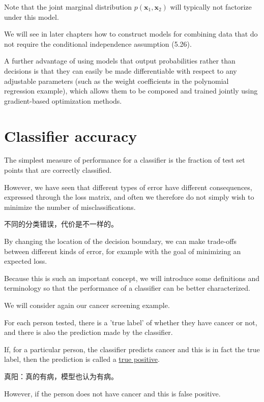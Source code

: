 \documentclass{article}
\begin{document}
Note that the joint marginal distribution $p(\mathbf{x}_{1},\mathbf{x}_{2})$ will typically not factorize under this model. 

We will see in later chapters how to construct models for combining data that do not require the conditional independence assumption (5.26). 

A further advantage of using models that output probabilities rather than decisions is that they can easily be made differentiable with respect to any adjustable parameters (such as the weight coefficients in the polynomial regression example), which allows them to be composed and trained jointly using gradient-based optimization methods.

\section{Classifier accuracy}

The simplest measure of performance for a classifier is the fraction of test set points that are correctly classified. 

However, we have seen that different types of error have different consequences, expressed through the loss matrix, and often we therefore do not simply wish to minimize the number of misclassifications. 

{\color{red}
不同的分类错误，代价是不一样的。
}

By changing the location of the decision boundary, we can make trade-offs between different kinds of error, for example with the goal of minimizing an expected loss. 

Because this is such an important concept, we will introduce some definitions and terminology so that the performance of a classifier can be better characterized.

We will consider again our cancer screening example. 

For each person tested, there is a 'true label' of whether they have cancer or not, and there is also the prediction made by the classifier. 

If, for a particular person, the classifier predicts cancer and this is in fact the true label, then the prediction is called a \underline{\color{red}true positive}. 

{\color{red}
真阳：真的有病，模型也认为有病。
}

However, if the person does not have cancer and this is false positive. 
\end{document}
